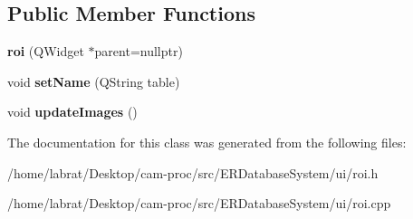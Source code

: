 \subsection*{Public Member Functions}
\begin{DoxyCompactItemize}
\item 
{\bfseries roi} (Q\+Widget $\ast$parent=nullptr)\hypertarget{classroi_a592be3a56199023d14eab9916f89d049}{}\label{classroi_a592be3a56199023d14eab9916f89d049}

\item 
void {\bfseries set\+Name} (Q\+String table)\hypertarget{classroi_ad576361c420174f13872c6e981e0ad31}{}\label{classroi_ad576361c420174f13872c6e981e0ad31}

\item 
void {\bfseries update\+Images} ()\hypertarget{classroi_af0cb6946ed71d46fef2a3f1b28c112db}{}\label{classroi_af0cb6946ed71d46fef2a3f1b28c112db}

\end{DoxyCompactItemize}


The documentation for this class was generated from the following files\+:\begin{DoxyCompactItemize}
\item 
/home/labrat/\+Desktop/cam-\/proc/src/\+E\+R\+Database\+System/ui/roi.\+h\item 
/home/labrat/\+Desktop/cam-\/proc/src/\+E\+R\+Database\+System/ui/roi.\+cpp\end{DoxyCompactItemize}
